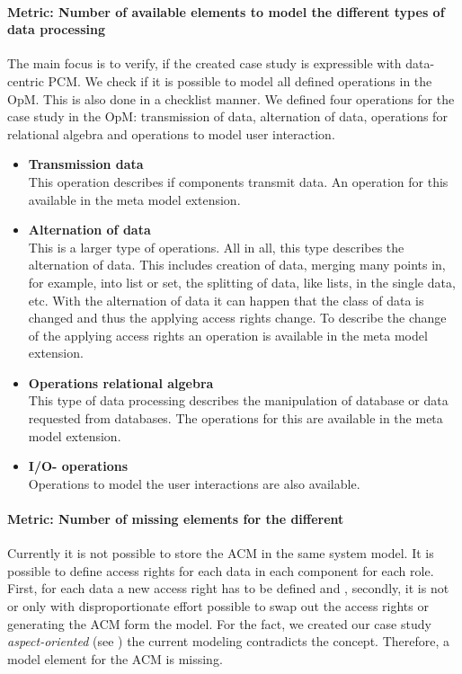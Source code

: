 \paragraph{Metric: Number of available elements to model the different types of data processing}
The main focus is to verify, if the created case study is expressible with data-centric PCM. We check if it is possible to model all defined operations in the OpM. %
This is also done in a checklist manner.
We defined four operations for the case study in the OpM: transmission of data, alternation of data, operations for relational algebra and operations to model user interaction. 
\begin{itemize}
\item \textbf{Transmission data} \\
This operation describes if components transmit data. An operation for this available in the meta model extension.

\item \textbf{Alternation of data} \\
This is a larger type of operations. All in all, this type describes the alternation of data. This includes
creation of data, merging many points in, for example, into list or set, the splitting of data, like lists, in the single data, etc. With the alternation of data it can happen that the class of data is changed and thus the applying access rights change. To describe the change of the applying access rights an operation is available in the meta model extension. 

\item \textbf{Operations relational algebra} \\
This type of data processing describes the manipulation of database or data requested from databases. The operations for this are available in the meta model extension. 

\item \textbf{I/O- operations} \\
Operations to model the user interactions are also available.
\end{itemize}
\paragraph{Metric: Number of missing elements for the different }
Currently it is not possible to store the ACM in the same system model. It is possible to define access rights for each data in each component for each role. First, for each data a new access right has to be defined and , secondly, it is not or only with disproportionate effort possible to swap out the access rights or generating the ACM form the model. For the fact, we created our case study \textit{aspect-oriented} (see \cite{}) the current modeling contradicts the concept. Therefore, a model element for the ACM is missing.
